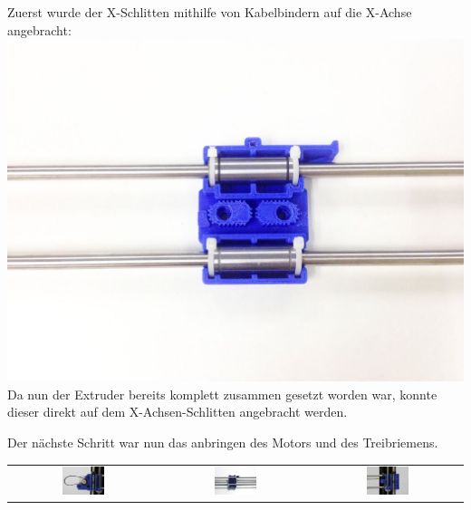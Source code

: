 Zuerst wurde der X-Schlitten mithilfe von Kabelbindern auf die X-Achse angebracht:\\
\includegraphics[clip=true, trim= 0 0 0 0, width=\textwidth]{Bilder/X_Assembly_2.jpg}
Da nun der Extruder bereits komplett zusammen gesetzt worden war, konnte dieser direkt auf dem X-Achsen-Schlitten angebracht werden.

Der nächste Schritt war nun das anbringen des Motors und des Treibriemens.\\
\begin{tabular}{ccc}
 \includegraphics[width=0.3\textwidth]{Bilder/X_Belt_1.jpg} & \includegraphics[width=0.3\textwidth]{Bilder/X_Belt_2.jpg} & \includegraphics[width=0.3\textwidth]{Bilder/X_Belt_3.jpg} \\ 
\end{tabular}

